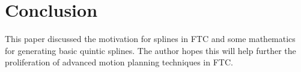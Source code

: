 \documentclass{article}
\begin{document}
\section{Conclusion}
This paper discussed the motivation for splines in FTC and some mathematics for generating basic quintic splines. The author hopes this will help further the proliferation of advanced motion planning techniques in FTC.
\end{document}
